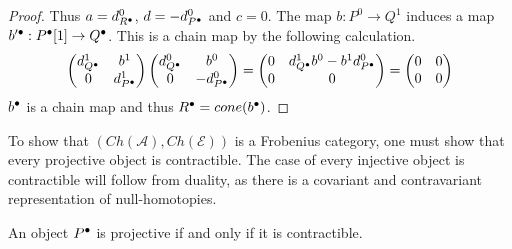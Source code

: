\begin{proof}
        Thus $a = d^0_{R^{\bullet}}$, $d = -d^0_{P^{\bullet}}$ and $c=0$. The map $b:P^0\rightarrow Q^1$ induces a map $b'^{\bullet}:P^{\bullet}[1]\rightarrow Q^{\bullet}$. This is a chain map by the following calculation.
        \begin{equation*}
            \begin{pmatrix} d^1_{Q^{\bullet}} & b^1 \\ 0 & d^1_{P^{\bullet}} \end{pmatrix}\begin{pmatrix} d^0_{Q^{\bullet}} & b^0 \\ 0 & -d^0_{P^{\bullet}} \end{pmatrix} = \begin{pmatrix} 0 & d^1_{Q^{\bullet}}b^0 - b^1d^0_{P^{\bullet}} \\ 0 & 0 \end{pmatrix} = \begin{pmatrix} 0 & 0 \\ 0 & 0 \end{pmatrix}
        \end{equation*}
        $b^{\bullet}$ is a chain map and thus $R^{\bullet}=cone(b^{\bullet})$.
    \end{proof}

    To show that $(Ch(\mathcal{A}),Ch(\mathcal{E}))$ is a Frobenius category, one must show that every projective object is contractible. The case of every injective object is contractible will follow from duality, as there is a covariant and contravariant representation of null-homotopies.

    \begin{prop}
        An object $P^{\bullet}$ is projective if and only if it is contractible.
    \end{prop}

